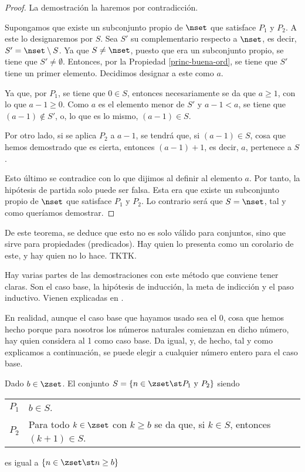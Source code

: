\begin{proof}
  La demostración la haremos por contradicción.

  Supongamos que existe un subconjunto propio de $\nset$ que satisface $P_1$
  y $P_2$. A este lo designaremos por $S$. Sea $S'$ su complementario
  respecto a $\nset$, es decir, $S' = \nset \setminus S$. Ya que $S \neq
  \nset$, puesto que era un subconjunto propio, se tiene que $S' \neq
  \emptyset$. Entonces, por la Propiedad \ref{princ-buena-ord}, se tiene que
  $S'$ tiene un primer elemento. Decidimos designar a este como $a$.

  Ya que, por $P_1$, se tiene que $0 \in S$, entonces necesariamente se da
  que $a \geq 1$, con lo que $a - 1 \geq 0$. Como $a$ es el elemento menor
  de $S'$ y $a - 1 < a$, se tiene que $(a - 1) \notin S'$, o, lo que es lo
  mismo, $(a - 1) \in S$.

  Por otro lado, si se aplica $P_2$ a $a - 1$, se tendrá que, si $(a - 1)
  \in S$, cosa que hemos demostrado que es cierta, entonces $(a - 1) + 1$,
  es decir, $a$, pertenece a $S$.

  Esto último se contradice con lo que dijimos al definir al elemento $a$.
  Por tanto, la hipótesis de partida solo puede ser falsa. Esta era que
  existe un subconjunto propio de $\nset$ que satisface $P_1$ y $P_2$. Lo
  contrario será que $S = \nset$, tal y como queríamos demostrar.
\end{proof}

De este teorema, se deduce que esto no es solo válido para conjuntos, sino
que sirve para propiedades (predicados). Hay quien lo presenta como un
corolario de este, y hay quien no lo hace. TKTK.

Hay varias partes de las demostraciones con este método que conviene tener
claras. Son el caso base, la hipótesis de inducción, la meta de indicción y
el paso inductivo. Vienen explicadas en \cite{idescent-newstead}.


En realidad, aunque el caso base que hayamos usado sea el 0, cosa que hemos
hecho porque para nosotros los números naturales comienzan en dicho número,
hay quien considera al 1 como caso base. Da igual, y, de hecho, tal y como
explicamos a continuación, se puede elegir a cualquier número entero para el
caso base.

\begin{corollary}
  Dado $b \in \zset$. El conjunto $S = \{n \in \zset \st P_1 \ \mathrm{y} \
  P_2\}$ siendo

  \begin{center}
    \begin{tabular}{l p{}}
      $P_1$ & $b \in S$. \\
      $P_2$ & Para todo $k \in \zset$ con $k \geq b$ se da que, si $k \in
        S$, entonces $(k+1) \in S$.
    \end{tabular}
  \end{center}

  \noindent es igual a $\{n \in \zset \st n \geq b\}$
\end{corollary}

